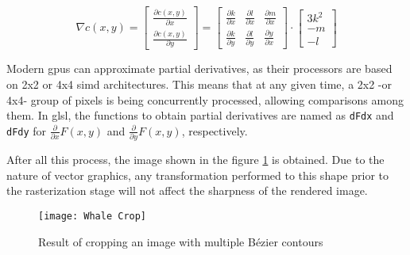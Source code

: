 \documentclass[\topdir/main.tex]{subfiles}
\begin{document}
\begin{equation} \label{eq:blinnloop_sdf_gra}
    \nabla c(x, y) = 
    \begin{bmatrix}
        \frac{\partial c(x, y)}{\partial x} \\
        \frac{\partial c(x, y)}{\partial y}
    \end{bmatrix}
    =
    \begin{bmatrix}
        \frac{\partial k}{\partial x} & \frac{\partial l}{\partial x} & \frac{\partial m}{\partial x} \\
        \frac{\partial k}{\partial y} & \frac{\partial l}{\partial y} & \frac{\partial y}{\partial x}
    \end{bmatrix}
    \cdot
    \begin{bmatrix}
        3 k^2 \\
        -m \\
        -l
    \end{bmatrix}
\end{equation}

Modern \glspl{gpu} can approximate partial derivatives, as their processors are based on 2x2 or 4x4 \gls{simd} architectures. This means that at any given time, a 2x2 -or 4x4- group of pixels is being concurrently processed, allowing comparisons among them. In \gls{glsl}, the functions to obtain partial derivatives are named as \texttt{dFdx} and \texttt{dFdy} for $\frac{\partial}{\partial x}F(x, y)$ and $\frac{\partial}{\partial y}F(x, y)$, respectively.\newline

After all this process, the image shown in the figure \ref{fig:a01:result} is obtained. Due to the nature of vector graphics, any transformation performed to this shape prior to the rasterization stage will not affect the sharpness of the rendered image.\newline

\begin{figure}[hbtp]
    \centering
    \texttt{[image: Whale Crop]}

    \caption{Result of cropping an image with multiple Bézier contours}
    \label{fig:a01:result}
\end{figure}

\printbibliography
\end{document}
